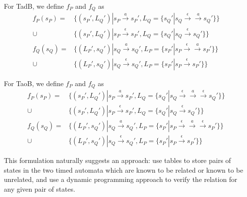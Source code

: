 \documentclass[a4paper]{llncs}
\begin{document}
For TadB, we define $f_P$ and $f_Q$ as
\begin{align*}
  f_P(s_P) = & \{(s_P', L_Q') | s_P \xrightarrow{a} s_P', 
  L_Q=\{ s_Q' | s_Q \xrightarrow{\epsilon}\xrightarrow{a} s_Q'\}\} \\
  \cup & \{(s_P', L_Q') | s_P \xrightarrow{\epsilon} s_P', 
  L_Q=\{ s_Q' | s_Q \xrightarrow{\epsilon} s_Q'\}\} \\
  f_Q(s_Q) = & \{(L_P', s_Q') | s_Q \xrightarrow{a} s_Q', 
  L_P=\{ s_P' | s_P \xrightarrow{\epsilon}\xrightarrow{a} s_P'\}\} \\
  \cup & \{(L_P', s_Q') | s_Q \xrightarrow{\epsilon} s_Q', 
  L_P=\{ s_P' | s_P \xrightarrow{\epsilon} s_P'\}\} 
\end{align*}

For TaoB, we define $f_P$ and $f_Q$ as
\begin{align*}
  f_P(s_P) = & \{(s_P', L_Q') | s_P \xrightarrow{a} s_P', 
  L_Q=\{ s_Q' | s_Q \xrightarrow{\epsilon}\xrightarrow{a}\xrightarrow{\epsilon} s_Q'\}\} \\
  \cup & \{(s_P', L_Q') | s_P \xrightarrow{\epsilon} s_P', 
  L_Q=\{ s_Q' | s_Q \xrightarrow{\epsilon} s_Q'\}\} \\
  f_Q(s_Q) = & \{(L_P', s_Q') | s_Q \xrightarrow{a} s_Q', 
  L_P=\{ s_P' | s_P \xrightarrow{\epsilon}\xrightarrow{a}\xrightarrow{\epsilon} s_P'\}\} \\
  \cup & \{(L_P', s_Q') | s_Q \xrightarrow{\epsilon} s_Q', 
  L_P=\{ s_P' | s_P \xrightarrow{\epsilon} s_P'\}\} 
\end{align*}

This formulation naturally suggests an approach: use tables to store
pairs of states in the two timed automata which are known to be
related or known to be unrelated, and use a dynamic programming
approach to verify the relation for any given pair of states.
\end{document}

